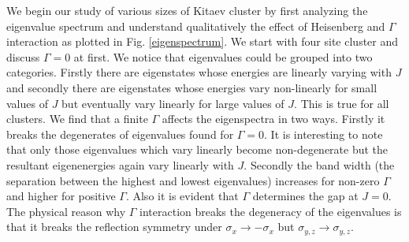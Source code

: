 \documentclass[aps,amsmath,twocolumn,amssymb,floatfix,showpacs,superscriptaddress,nofootinbib,longbibliography]{revtex4-1}
\begin{document}
We begin our study of various sizes of Kitaev cluster by first analyzing the eigenvalue spectrum and understand qualitatively the effect of Heisenberg and $\Gamma$ interaction as plotted in Fig. \ref{eigenspectrum}. We start with four site cluster and discuss $\Gamma=0$ at first. We notice that eigenvalues could be grouped into two categories. Firstly there are eigenstates whose energies are linearly varying with $J$ and secondly there are eigenstates whose energies vary non-linearly  for small values of $J$ but eventually vary linearly for large values of $J$. This is true for all clusters. We find that a finite $\Gamma$ affects the eigenspectra in two ways. Firstly it breaks the degenerates of eigenvalues found for $\Gamma=0$. It is interesting to note that only those eigenvalues which vary linearly become non-degenerate but the resultant eigenenergies again vary linearly with $J$. Secondly the band width (the separation between the highest and lowest eigenvalues) increases for non-zero $\Gamma$ and higher for positive $\Gamma$. Also it is evident that $\Gamma$ determines the gap at $J=0$. The physical reason why $\Gamma$ interaction breaks the degeneracy of the eigenvalues is that it breaks the reflection symmetry under $\sigma_x \rightarrow - \sigma_x$ but $\sigma_{y,z} \rightarrow \sigma_{y,z}$. \\
\indent
\end{document}
